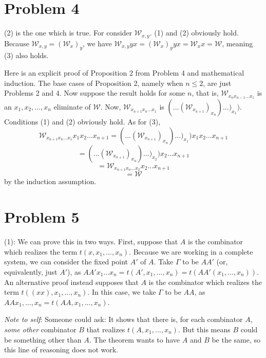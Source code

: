 \documentclass{article}
\theoremstyle{definition}
\begin{document}
\section*{Problem 4}
(2) is the one which is true. For consider $\mathcal{W}_{x,y}$. (1) and (2) obviously hold. Because $\mathcal{W}_{x,y}=(\mathcal{W}_x)_y$, we have
$\mathcal{W}_{x,y}yx=(\mathcal{W}_x)_yyx=\mathcal{W}_xx=\mathcal{W}$, meaning (3) also holds.


Here is an explicit proof of Proposition 2 from Problem 4 and mathematical induction. The base cases of Proposition 2, namely when $n\le 2$, are just Problems 2 and 4. 
Now suppose the result holds for some $n$, that is, $\mathcal{W}_{x_nx_{n-1}...x_1}$ is an $x_1,x_2,...,x_n$ eliminate of $\mathcal{W}$. Now, 
$\mathcal{W}_{x_{n+1}x_n...x_1}$ is $(...(\mathcal{W}_{x_{n+1}})_{x_n})...)_{x_1})$. Conditions (1) and (2) obviously hold. As for (3), 
\[ \mathcal{W}_{x_{n+1}x_n...x_1}x_1x_2...x_{n+1}=(...(\mathcal{W}_{x_{n+1}})_{x_n})...)_{x_1})x_1x_2...x_{n+1} \]
\[ =(...(\mathcal{W}_{x_{n+1}})_{x_n})...)_{x_2})x_2...x_{n+1} \]
\[ =\mathcal{W}_{x_{n+1}x_n...x_2}x_2...x_{n+1} \]
\[ =\mathcal{W} \]
by the induction assumption.

\section*{Problem 5}
(1): We can prove this in two ways. First, suppose that $A$ is the combinator which realizes the term $t(x,x_1,...,x_n)$. Because we are working in a complete system, 
we can consider the fixed point $A'$ of $A$. Take $\Gamma$ to be $AA'$ (or, equivalently, just $A'$), 
as $AA'x_1...x_n=t(A',x_1,...,x_n)=t(AA'(x_1,...,x_n))$. An alternative proof instead supposes that 
$A$ is the combinator which realizes the term $t((xx),x_1,...,x_n)$. In this case, we take $\Gamma$ to be $AA$,
as $AAx_1,...,x_n=t(AA,x_1,...,x_n)$.


\textit{Note to self}: Someone could ask:  It shows that there is, for each combinator $A$, \textit{some other} combinator $B$ that realizes 
$t(A,x_1,...,x_n)$. But this means $B$ could be something other than $A$. The theorem wants to have $A$ and $B$ be the same, so this line of reasoning does not work.  
\end{document}
